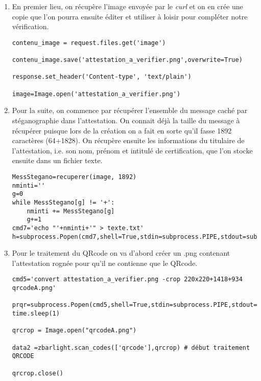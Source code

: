\documentclass[12pt]{article}
\newcommand{\1}{\mathbbm{1}}
\begin{document}
\begin{enumerate}[label=(\arabic*)]	
	
\item En premier lieu, on récupère l'image envoyée par le \textit{curl} et on en crée une copie que l'on pourra ensuite éditer et utiliser à loisir pour compléter notre vérification. 

\begin{lstlisting}
contenu_image = request.files.get('image')

contenu_image.save('attestation_a_verifier.png',overwrite=True)

response.set_header('Content-type', 'text/plain')

image=Image.open('attestation_a_verifier.png')
\end{lstlisting}
\vspace*{7mm}
\item Pour la suite, on commence par récupérer l'ensemble du message caché par stéganographie dans l'attestation. On connait déjà la taille du message à récupérer puisque lors de la création on a fait en sorte qu'il fasse 1892 caractères (64+1828). On récupère ensuite les informations du titulaire de l'attestation, i.e. son nom, prénom et intitulé de certification, que l'on stocke ensuite dans un fichier texte.

\begin{lstlisting}
MessStegano=recuperer(image, 1892)
nminti=''
g=0
while MessStegano[g] != '+':
	nminti += MessStegano[g]
	g+=1
cmd7='echo "'+nminti+'" > texte.txt'
h=subprocess.Popen(cmd7,shell=True,stdin=subprocess.PIPE,stdout=subprocess.PIPE)
\end{lstlisting}
\vspace*{7mm}

\item Pour le traitement du QRcode on va d'abord créer un .png contenant l'attestation rognée pour qu'il ne contienne que le QRcode.

\begin{lstlisting}
cmd5='convert attestation_a_verifier.png -crop 220x220+1418+934 qrcodeA.png'

prqr=subprocess.Popen(cmd5,shell=True,stdin=subprocess.PIPE,stdout=subprocess.PIPE)
time.sleep(1)

qrcrop = Image.open("qrcodeA.png")

data2 =zbarlight.scan_codes(['qrcode'],qrcrop) # début traitement QRCODE

qrcrop.close()
\end{lstlisting}
\vspace*{7mm}


\end{enumerate}
\end{document}
